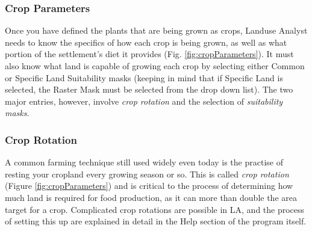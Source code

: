     \subsubsection{Crop Parameters}
    \label{cropParameters}
      Once you have defined the plants that are being grown as crops, Landuse
      Analyst needs to know the specifics of how each crop is being grown, as
      well as what portion of the settlement's diet it provides (Fig.
      \ref{fig:cropParameters}).  It must also know what land is capable of
      growing each crop by selecting either Common or Specific Land Suitability masks
      (keeping in mind that if Specific Land is selected, the Raster Mask must
      be selected from the drop down list).  The two major entries, however,
      involve \textit{crop rotation} and the selection of \textit{suitability masks}.
    \subsubsection{Crop Rotation}
    \label{cropRotation}
      A common farming technique still used widely even today is the practise of
      resting your cropland every growing season or so.  This is called
      \textit{crop rotation} (Figure \ref{fig:cropParameters}) and is critical
      to the process of determining how much land is required for food production,
      as it can more than double the area target for a crop.  Complicated crop 
      rotations are possible in LA, and the process of setting this up are
      explained in detail in the Help section of the program itself.

